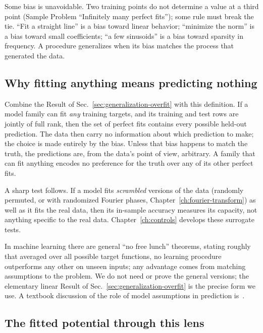 Some bias is unavoidable. Two training points do not determine a value at a third point (Sample Problem ``Infinitely many perfect fits''); some rule must break the tie. ``Fit a straight line'' is a bias toward linear behavior; ``minimize the norm'' is a bias toward small coefficients; ``a few sinusoids'' is a bias toward sparsity in frequency. A procedure generalizes when its bias matches the process that generated the data.

\subsection{Why fitting anything means predicting nothing}

Combine the Result of Sec.~\ref{sec:generalization-overfit} with this definition. If a model family can fit \emph{any} training targets, and its training and test rows are jointly of full rank, then the set of perfect fits contains every possible held-out prediction. The data then carry no information about which prediction to make; the choice is made entirely by the bias. Unless that bias happens to match the truth, the predictions are, from the data's point of view, arbitrary. A family that can fit anything encodes no preference for the truth over any of its other perfect fits.

A sharp test follows. If a model fits \emph{scrambled} versions of the data (randomly permuted, or with randomized Fourier phases, Chapter~\ref{ch:fourier-transform}) as well as it fits the real data, then its in-sample accuracy measures its capacity, not anything specific to the real data. Chapter~\ref{ch:controls} develops these surrogate tests.

\begin{beyond}
In machine learning there are general ``no free lunch'' theorems, stating roughly that averaged over all possible target functions, no learning procedure outperforms any other on unseen inputs; any advantage comes from matching assumptions to the problem. We do not need or prove the general versions; the elementary linear Result of Sec.~\ref{sec:generalization-overfit} is the precise form we use. A textbook discussion of the role of model assumptions in prediction is~\cite{esl}.
\end{beyond}

\subsection{The fitted potential through this lens}

